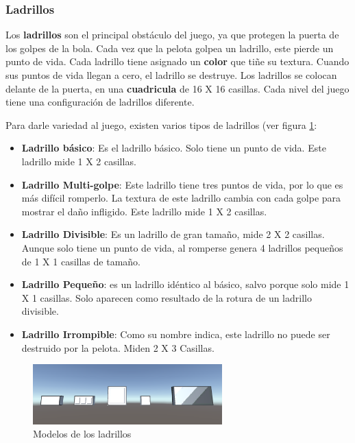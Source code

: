 \subsubsection{Ladrillos}
Los \textbf{ladrillos} son el principal obstáculo del juego, ya que protegen la puerta de los golpes de la bola. Cada vez que la pelota golpea un ladrillo, este pierde un punto de vida. Cada ladrillo tiene asignado un \textbf{color} que tiñe su textura. Cuando sus puntos de vida llegan a cero, el ladrillo se destruye. Los ladrillos se colocan delante de la puerta, en una \textbf{cuadricula} de 16 X 16 casillas. Cada nivel del juego tiene una configuración de ladrillos diferente. 

Para darle variedad al juego, existen varios tipos de ladrillos (ver figura \ref{bricks_models}:
\begin{itemize}
\item \textbf{Ladrillo básico}: Es el ladrillo básico. Solo tiene un punto de vida. Este ladrillo mide 1 X 2 casillas.
\item \textbf{Ladrillo Multi-golpe}: Este ladrillo tiene tres puntos de vida, por lo que es más difícil romperlo. La textura de este ladrillo cambia con cada golpe para mostrar el daño infligido. Este ladrillo mide 1 X 2 casillas.
\item \textbf{Ladrillo Divisible}: Es un ladrillo de gran tamaño, mide 2 X 2 casillas. Aunque solo tiene un punto de vida, al romperse genera 4 ladrillos pequeños de 1 X 1 casillas de tamaño.
\item \textbf{Ladrillo Pequeño}: es un ladrillo idéntico al básico, salvo porque solo mide 1 X 1 casillas. Solo aparecen como resultado de la rotura de un ladrillo divisible.
\item \textbf{Ladrillo Irrompible}: Como su nombre indica, este ladrillo no puede ser destruido por la pelota. Miden 2 X 3 Casillas.
\end{itemize}
\begin{figure}[h]
	\includegraphics[width=0.65\textwidth]{images/estructura/fisica/brick_examples}
	\centering
	\caption{Modelos de los ladrillos}
	\label{bricks_models}
\end{figure}

